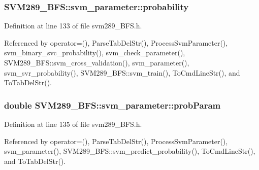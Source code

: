 \subsubsection[{\texorpdfstring{probability}{probability}}]{ S\+V\+M289\+\_\+\+B\+F\+S\+::svm\+\_\+parameter\+::probability}\hypertarget{struct_s_v_m289___b_f_s_1_1svm__parameter_acfe1c2e7915f38fd2c82cbf7403f6428}{}\label{struct_s_v_m289___b_f_s_1_1svm__parameter_acfe1c2e7915f38fd2c82cbf7403f6428}


Definition at line 133 of file svm289\+\_\+\+B\+F\+S.\+h.



Referenced by operator=(), Parse\+Tab\+Del\+Str(), Process\+Svm\+Parameter(), svm\+\_\+binary\+\_\+svc\+\_\+probability(), svm\+\_\+check\+\_\+parameter(), S\+V\+M289\+\_\+\+B\+F\+S\+::svm\+\_\+cross\+\_\+validation(), svm\+\_\+parameter(), svm\+\_\+svr\+\_\+probability(), S\+V\+M289\+\_\+\+B\+F\+S\+::svm\+\_\+train(), To\+Cmd\+Line\+Str(), and To\+Tab\+Del\+Str().

\subsubsection[{\texorpdfstring{prob\+Param}{probParam}}]{\setlength{\rightskip}{0pt plus 5cm}double S\+V\+M289\+\_\+\+B\+F\+S\+::svm\+\_\+parameter\+::prob\+Param}\hypertarget{struct_s_v_m289___b_f_s_1_1svm__parameter_a7609863bd4ebc93577c59a67f2af3f71}{}\label{struct_s_v_m289___b_f_s_1_1svm__parameter_a7609863bd4ebc93577c59a67f2af3f71}


Definition at line 135 of file svm289\+\_\+\+B\+F\+S.\+h.



Referenced by operator=(), Parse\+Tab\+Del\+Str(), Process\+Svm\+Parameter(), svm\+\_\+parameter(), S\+V\+M289\+\_\+\+B\+F\+S\+::svm\+\_\+predict\+\_\+probability(), To\+Cmd\+Line\+Str(), and To\+Tab\+Del\+Str().

